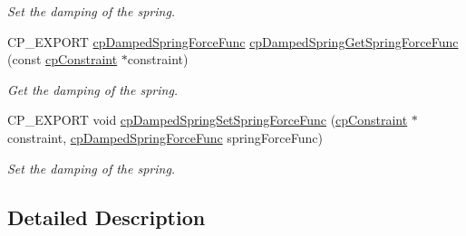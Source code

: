 \begin{DoxyCompactItemize}
\begin{DoxyCompactList}\small\item\em Set the damping of the spring. \end{DoxyCompactList}\item 
\mbox{\label{group__cp_damped_spring_ga8b377b8e58179c638460d735b568930a}} 
C\+P\+\_\+\+E\+X\+P\+O\+RT \mbox{\hyperlink{group__cp_damped_spring_gad88d8466e0057d4ad05183fb14fa274d}{cp\+Damped\+Spring\+Force\+Func}} \mbox{\hyperlink{group__cp_damped_spring_ga8b377b8e58179c638460d735b568930a}{cp\+Damped\+Spring\+Get\+Spring\+Force\+Func}} (const \mbox{\hyperlink{structcp_constraint}{cp\+Constraint}} $\ast$constraint)
\begin{DoxyCompactList}\small\item\em Get the damping of the spring. \end{DoxyCompactList}\item 
\mbox{\label{group__cp_damped_spring_ga5a663e7d5e0c88f26719af1d543c1db8}} 
C\+P\+\_\+\+E\+X\+P\+O\+RT void \mbox{\hyperlink{group__cp_damped_spring_ga5a663e7d5e0c88f26719af1d543c1db8}{cp\+Damped\+Spring\+Set\+Spring\+Force\+Func}} (\mbox{\hyperlink{structcp_constraint}{cp\+Constraint}} $\ast$constraint, \mbox{\hyperlink{group__cp_damped_spring_gad88d8466e0057d4ad05183fb14fa274d}{cp\+Damped\+Spring\+Force\+Func}} spring\+Force\+Func)
\begin{DoxyCompactList}\small\item\em Set the damping of the spring. \end{DoxyCompactList}\end{DoxyCompactItemize}


\subsection{Detailed Description}
